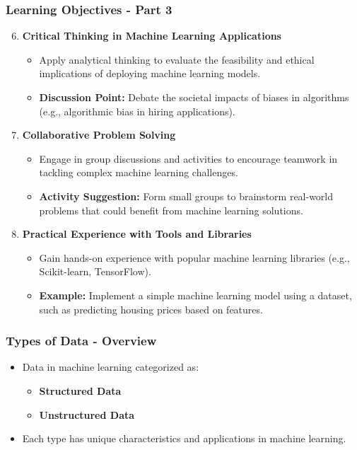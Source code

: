 \documentclass[aspectratio=169]{beamer}
\begin{document}
\begin{frame}[fragile]
    \frametitle{Learning Objectives - Part 3}
    \begin{enumerate}
        \setcounter{enumi}{5} %
        \item \textbf{Critical Thinking in Machine Learning Applications}
        \begin{itemize}
            \item Apply analytical thinking to evaluate the feasibility and ethical implications of deploying machine learning models.
            \item \textbf{Discussion Point:} Debate the societal impacts of biases in algorithms (e.g., algorithmic bias in hiring applications).
        \end{itemize}

        \item \textbf{Collaborative Problem Solving}
        \begin{itemize}
            \item Engage in group discussions and activities to encourage teamwork in tackling complex machine learning challenges.
            \item \textbf{Activity Suggestion:} Form small groups to brainstorm real-world problems that could benefit from machine learning solutions.
        \end{itemize}
        
        \item \textbf{Practical Experience with Tools and Libraries}
        \begin{itemize}
            \item Gain hands-on experience with popular machine learning libraries (e.g., Scikit-learn, TensorFlow).
            \item \textbf{Example:} Implement a simple machine learning model using a dataset, such as predicting housing prices based on features.
        \end{itemize}
    \end{enumerate}
\end{frame}

\begin{frame}[fragile]
    \frametitle{Types of Data - Overview}
    \begin{itemize}
        \item Data in machine learning categorized as:
        \begin{itemize}
            \item \textbf{Structured Data}
            \item \textbf{Unstructured Data}
        \end{itemize}
        \item Each type has unique characteristics and applications in machine learning.
    \end{itemize}
\end{frame}
\end{document}
